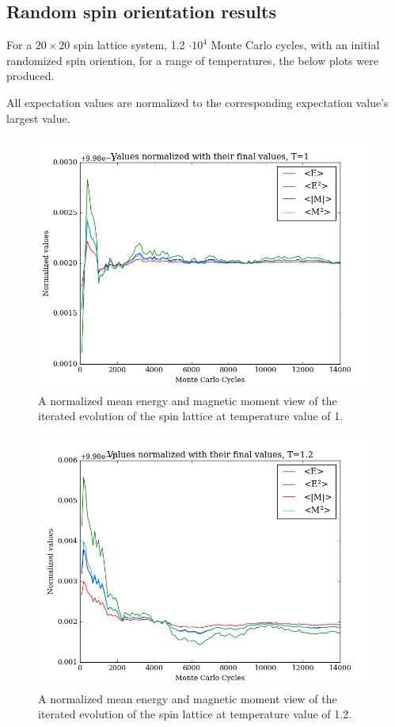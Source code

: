 \documentclass[11pt,a4paper,notitlepage,twocolumn]{article}
\begin{document}
\subsection{Random spin orientation results}
For a $20\times20$ spin lattice system, 1.2 $\cdot 10^4$ Monte Carlo cycles, with an initial randomized spin oriention, for a range of temperatures, the below plots were produced.

All expectation values are normalized to the corresponding expectation value's largest value.
\begin{figure}
[H]\center
\includegraphics[scale=0.35]{../figs/4c/Prob_L20_mc100000_T100_spinrandom.png}
\caption{A normalized mean energy and magnetic moment view of the iterated evolution of the spin lattice at temperature value of 1.}
\end{figure}
\begin{figure}
[H]\center
\includegraphics[scale=0.35]{../figs/4c/Prob_L20_mc100000_T120_spinrandom.png}
\caption{A normalized mean energy and magnetic moment view of the iterated evolution of the spin lattice at temperature value of 1.2.}
\end{figure}
\end{document}

